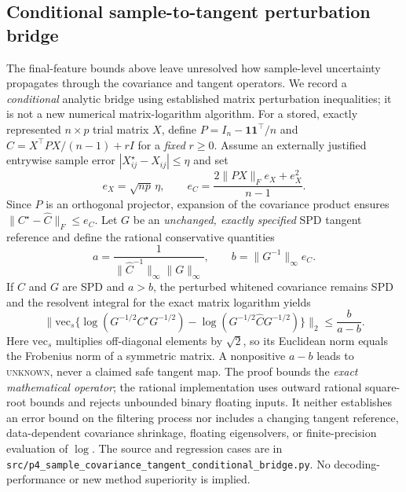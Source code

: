 \subsection{Conditional sample-to-tangent perturbation bridge}
The final-feature bounds above leave unresolved how sample-level uncertainty
propagates through the covariance and tangent operators. We record a
\emph{conditional} analytic bridge using established matrix perturbation
inequalities; it is not a new numerical matrix-logarithm algorithm.
For a stored, exactly represented $n\times p$ trial matrix $X$, define
$P=I_n-\mathbf{1}\mathbf{1}^{\top}/n$ and
$\widehat C=X^\top P X/(n-1)+rI$ for a \emph{fixed} $r\geq 0$.
Assume an externally justified entrywise sample error
$|X^\star_{ij}-X_{ij}|\leq\eta$ and set
\[
 e_X=\sqrt{np}\,\eta,\qquad
 e_C=\frac{2\|PX\|_F e_X+e_X^2}{n-1}.
\]
Since $P$ is an orthogonal projector, expansion of the covariance product
ensures $\|C^\star-\widehat C\|_F\leq e_C$.
Let $G$ be an \emph{unchanged, exactly specified} SPD tangent
reference and define the rational conservative quantities
\[
 a=\frac{1}{\|\widehat C^{-1}\|_\infty\|G\|_\infty},
 \qquad b=\|G^{-1}\|_\infty e_C.
\]
If $\widehat C$ and $G$ are SPD and $a>b$, the perturbed whitened
covariance remains SPD and the resolvent integral for the exact
matrix logarithm yields
\[
 \big\|\mathrm{vec}_{s}\{\log(G^{-1/2}C^\star G^{-1/2})
 -\log(G^{-1/2}\widehat C G^{-1/2})\}\big\|_2
 \leq \frac{b}{a-b}.
\]
Here $\mathrm{vec}_{s}$ multiplies off-diagonal elements by $\sqrt{2}$,
so its Euclidean norm equals the Frobenius norm of a symmetric matrix.
A nonpositive $a-b$ leads to \textsc{unknown}, never a claimed safe
tangent map. The proof bounds the \emph{exact mathematical operator};
the rational implementation uses outward rational square-root bounds
and rejects unbounded binary floating inputs. It neither establishes
an error bound on the filtering process nor includes a changing tangent
reference, data-dependent covariance shrinkage, floating eigensolvers,
or finite-precision evaluation of $\log$. The source and regression
cases are in \texttt{src/p4\_sample\_covariance\_tangent\_conditional\_bridge.py}.
No decoding-performance or new method superiority is implied.
